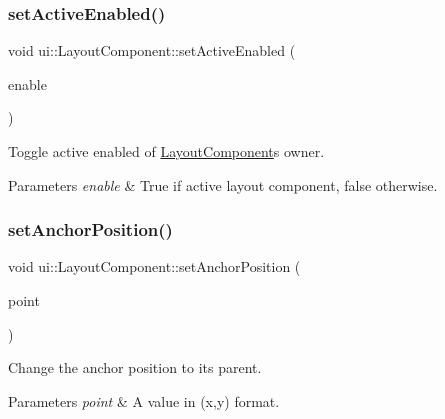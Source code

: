 \subsubsection{\texorpdfstring{set\+Active\+Enabled()}{setActiveEnabled()}\hspace{0.1cm}{\footnotesize\ttfamily [2/2]}}
{\footnotesize\ttfamily void ui\+::\+Layout\+Component\+::set\+Active\+Enabled (\begin{DoxyParamCaption}\item[{bool}]{enable }\end{DoxyParamCaption})}

Toggle active enabled of \hyperlink{classui_1_1LayoutComponent}{Layout\+Component}\textquotesingle{}s owner. 
\begin{DoxyParams}{Parameters}
{\em enable} & True if active layout component, false otherwise. \\
\hline
\end{DoxyParams}
\mbox{\label{classui_1_1LayoutComponent_ae6d9fb9a3ca2f54076975d7723bb9f16}} 
\subsubsection{\texorpdfstring{set\+Anchor\+Position()}{setAnchorPosition()}\hspace{0.1cm}{\footnotesize\ttfamily [1/2]}}
{\footnotesize\ttfamily void ui\+::\+Layout\+Component\+::set\+Anchor\+Position (\begin{DoxyParamCaption}\item[{const \hyperlink{classVec2}{Point} \&}]{point }\end{DoxyParamCaption})}

Change the anchor position to it\textquotesingle{}s parent. 
\begin{DoxyParams}{Parameters}
{\em point} & A value in (x,y) format. \\
\hline
\end{DoxyParams}
\mbox{\label{classui_1_1LayoutComponent_ae6d9fb9a3ca2f54076975d7723bb9f16}} 
